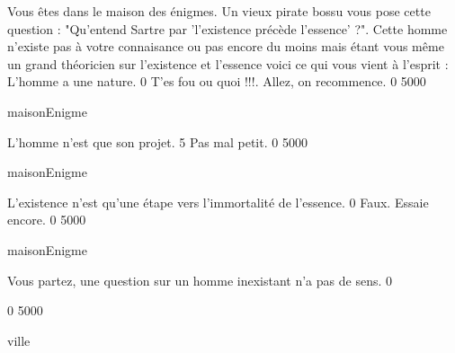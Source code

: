\begin{listing}{1}
Vous êtes dans le maison des énigmes. Un vieux pirate bossu vous pose cette question : 
"Qu'entend Sartre par 'l'existence précède l'essence' ?". 
Cette homme n'existe pas à votre connaisance ou pas encore du moins mais 
étant vous même un grand théoricien sur l'existence et l'essence voici ce 
qui vous vient à l'esprit :
L'homme a une nature.
0
T'es fou ou quoi !!!. Allez, on recommence.
0
5000

maisonEnigme

L'homme n'est que son projet.
5
Pas mal petit.
0
5000

maisonEnigme

L'existence n'est qu'une étape vers l'immortalité de l'essence.
0
Faux. Essaie encore.
0
5000

maisonEnigme

Vous partez, une question sur un homme inexistant n'a pas de sens.
0

0
5000

ville


\end{listing}

